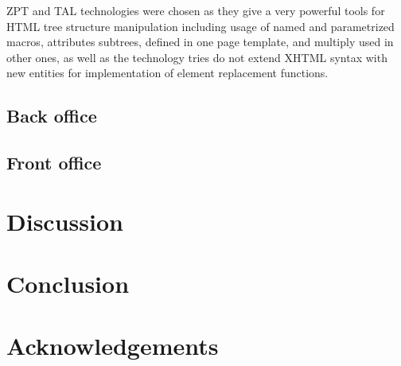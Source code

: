 \documentclass[conference]{IEEEtran}
\begin{document}
ZPT and TAL technologies were chosen as they give a very powerful tools for HTML tree structure manipulation including usage of named and parametrized macros, attributes subtrees, defined in one page template, and multiply used in other ones, as well as the technology tries do not extend XHTML syntax with new entities for implementation of element replacement functions.

\subsection{Back office}
\label{sec:back}

\subsection{Front office}
\label{sec:back}

\section{Discussion}
\label{sec:disc}

\section*{Conclusion}
\label{sec:conc}


\section*{Acknowledgements}
\label{sec:ack}

\end{document}
